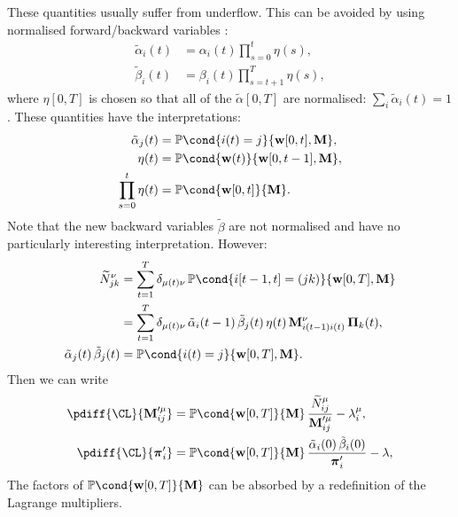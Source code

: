 \documentclass[12pt]{article}
\newcommand{\pib}{\boldsymbol{\pi}}
\newcommand{\Pib}{\boldsymbol{\Pi}}
\newcommand{\w}{\mathbf{w}}
\newcommand{\M}{\mathbf{M}}
\newcommand{\pr}{\mathbb{P}}
\begin{document}
These quantities usually suffer from underflow.
This can be avoided by using normalised forward/backward variables \cite{Zhai2003HMMnorm}:
%
\begin{equation}\label{eq:normalphabeta}
\begin{aligned}
  \tilde{\alpha}_i(t) &= \alpha_i(t) \prod_{s=0}^{t} \eta(s), \\
  \tilde{\beta}_i(t) &= \beta_i(t) \prod_{s=t+1}^{T} \eta(s),
\end{aligned}
\end{equation}
%
where $\eta[0,T]$ is chosen so that all of the $\tilde{\alpha}[0,T]$ are normalised: $\sum_i \tilde{\alpha}_i(t) = 1$.
These quantities have the interpretations:
%
\begin{equation}\label{eq:normintepr}
\begin{aligned}
  \tilde{\alpha}_j(t) &= \pr\cond{i(t)=j}{\w[0,t],\M}, \\
  \eta(t) &= \pr\cond{\w(t)}{\w[0,t-1],\M}, \\
  \prod_{s=0}^t \eta(t) &= \pr\cond{\w[0,t]}{\M}.
\end{aligned}
\end{equation}
%
Note that the new backward variables $\tilde{\beta}$ are not normalised and have no particularly interesting interpretation.
However:
%
\begin{equation}\label{eq:normstateprob}
\begin{aligned}
  \widetilde{N}^\nu_{jk} &= \sum_{t=1}^{T} \delta_{\mu(t)\nu} \, \pr\cond{i[t-1,t]=(jk)}{\w[0,T],\M} \\
     &= \sum_{t=1}^{T} \delta_{\mu(t)\nu} \, \tilde{\alpha}_i(t-1) \, \tilde{\beta}_j(t) \, \eta(t) \, \M^{\nu}_{i(t-1)i(t)} \, \Pib_k(t) ,\\
  \tilde{\alpha}_j(t) \, \tilde{\beta}_j(t) &= \pr\cond{i(t)=j}{\w[0,T],\M}.
\end{aligned}
\end{equation}
%
Then we can write
%
\begin{equation}\label{eq:singlediffsnorm}
\begin{aligned}
  \pdiff{\CL}{\M'^\mu_{ij}} &= \pr\cond{\w[0,T]}{\M} \, \frac{ \widetilde{N}^\mu_{ij} }{ \M'^\mu_{ij} } - \lambda^\mu_{i}, \\
  \pdiff{\CL}{\pib'_{i}} &= \pr\cond{\w[0,T]}{\M} \, \frac{ \tilde{\alpha}_i(0) \, \tilde{\beta}_i(0) }{ \pib'_{i} } - \lambda,
\end{aligned}
\end{equation}
%
The factors of $\pr\cond{\w[0,T]}{\M}$ can be absorbed by a redefinition of the Lagrange multipliers.
\end{document}
